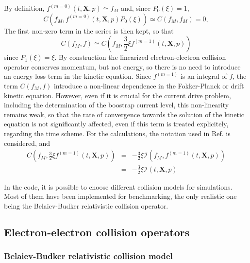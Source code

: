 By definition, $f^{\left( m=0\right) }\left( t,\mathbf{X},p\right) \simeq
f_{M}$ and, since $P_{0}\left( \xi \right) =1$,
\[
C\left( f_{M},f^{\left( m=0\right) }\left( t,\mathbf{X},p\right) P_{0}\left(
\xi \right) \right) \simeq C\left( f_{M},f_{M}\right) =0,
\]
The first non-zero term in the series is then kept, so that
\begin{equation}
C\left( f_{M},f\right) \simeq C\left( f_{M},\frac{3}{2}\xi f^{\left(
m=1\right) }\left( t,\mathbf{X},p\right) \right)
\end{equation}
since $P_{1}\left( \xi \right) =\xi .$ By construction the linearized
electron-electron collision operator conserves momentum, but not energy, so
there is no need to introduce an energy loss term in the kinetic equation.
Since $f^{\left( m=1\right) }$ is an integral of $f$, the term $C\left(
f_{M},f\right) $ introduce a non-linear dependence in the Fokker-Planck or
drift kinetic equation. However, even if it is crucial for the current drive
problem, including the determination of the boostrap current level, this
non-linearity remains weak, so that the rate of convergence towards the
solution of the kinetic equation is not significantly affected, even if this
term is treated explicitely, regarding the time scheme. For the
calculations, the notation used in Ref. \cite{shk97} is considered, and
\begin{eqnarray}
C\left( f_{M},\frac{3}{2}\xi f^{\left( m=1\right) }\left( t,\mathbf{X}
,p\right) \right) &=&-\frac{3}{2}\xi \mathcal{I}\left( f_{M},f^{\left(
m=1\right) }\left( t,\mathbf{X},p\right) \right)  \nonumber \\
&=&-\frac{3}{2}\xi \mathcal{I}\left( t,\mathbf{X},p\right)
\end{eqnarray}

In the code, it is possible to choose different collision models for
simulations. Most of them have been implemented for benchmarking, the only
realistic one being the Belaiev-Budker relativistic collision operator.

\subsection{Electron-electron collision operators}

\subsubsection{Belaiev-Budker relativistic collision model}

